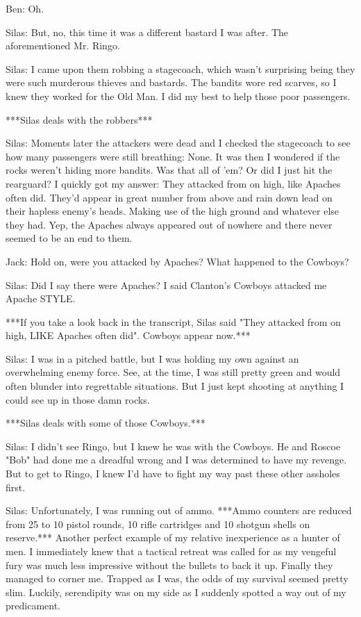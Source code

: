 \documentclass{article}
\begin{document}
Ben: Oh.

Silas: But, no, this time it was a different bastard I was after. The aforementioned Mr. Ringo.

Silas: I came upon them robbing a stagecoach, which wasn't surprising being they were such murderous thieves and bastards. The bandits wore red scarves, so I knew they worked for the Old Man. I did my best to help those poor passengers.

***Silas deals with the robbers***

Silas: Moments later the attackers were dead and I checked the stagecoach to see how many passengers were still breathing: None. It was then I wondered if the rocks weren't hiding more bandits. Was that all of 'em? Or did I just hit the rearguard? I quickly got my answer: They attacked from on high, like Apaches often did. They'd appear in great number from above and rain down lead on their hapless enemy's heads. Making use of the high ground and whatever else they had. Yep, the Apaches always appeared out of nowhere and there never seemed to be an end to them.

Jack: Hold on, were you attacked by Apaches? What happened to the Cowboys?

Silas: Did I say there were Apaches? I said Clanton's Cowboys attacked me Apache STYLE.

***If you take a look back in the transcript, Silas said "They attacked from on high, LIKE Apaches often did". Cowboys appear now.***

Silas: I was in a pitched battle, but I was holding my own against an overwhelming enemy force. See, at the time, I was still pretty green and would often blunder into regrettable situations. But I just kept shooting at anything I could see up in those damn rocks.

***Silas deals with some of those Cowboys.***

Silas: I didn't see Ringo, but I knew he was with the Cowboys. He and Roscoe "Bob" had done me a dreadful wrong and I was determined to have my revenge. But to get to Ringo, I knew I'd have to fight my way past these other assholes first.

Silas: Unfortunately, I was running out of ammo. ***Ammo counters are reduced from 25 to 10 pistol rounds, 10 rifle cartridges and 10 shotgun shells on reserve.*** Another perfect example of my relative inexperience as a hunter of men. I immediately knew that a tactical retreat was called for as my vengeful fury was much less impressive without the bullets to back it up. Finally they managed to corner me. Trapped as I was, the odds of my survival seemed pretty slim. Luckily, serendipity was on my side as I suddenly spotted a way out of my predicament.
\end{document}
